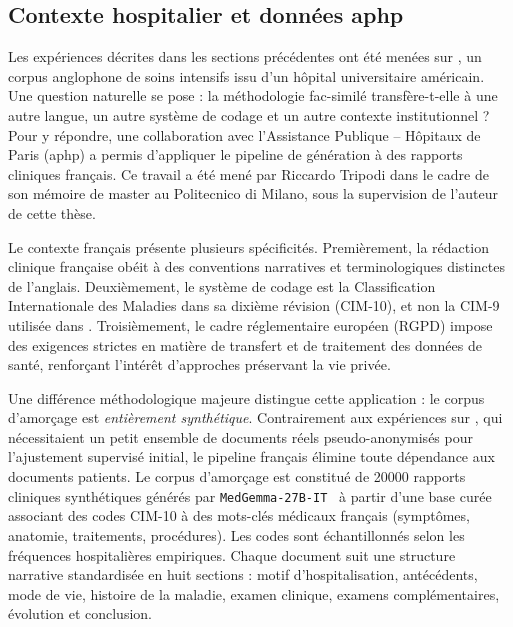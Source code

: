

\subsection{Contexte hospitalier et données \gls{aphp}}

Les expériences décrites dans les sections précédentes ont été menées sur \mimic{}, un corpus anglophone de soins intensifs issu d'un hôpital universitaire américain.
Une question naturelle se pose : la méthodologie fac-similé transfère-t-elle à une autre langue, un autre système de codage et un autre contexte institutionnel ?
Pour y répondre, une collaboration avec l'Assistance Publique -- Hôpitaux de Paris (\gls{aphp}) a permis d'appliquer le pipeline de génération à des rapports cliniques français.
Ce travail a été mené par Riccardo Tripodi dans le cadre de son mémoire de master au Politecnico di Milano, sous la supervision de l'auteur de cette thèse.

Le contexte français présente plusieurs spécificités.
Premièrement, la rédaction clinique française obéit à des conventions narratives et terminologiques distinctes de l'anglais.
Deuxièmement, le système de codage est la Classification Internationale des Maladies dans sa dixième révision (CIM-10), et non la CIM-9 utilisée dans \mimic{}.
Troisièmement, le cadre réglementaire européen (RGPD) impose des exigences strictes en matière de transfert et de traitement des données de santé, renforçant l'intérêt d'approches préservant la vie privée.

Une différence méthodologique majeure distingue cette application : le corpus d'amorçage est \emph{entièrement synthétique}.
Contrairement aux expériences sur \mimic{}, qui nécessitaient un petit ensemble de documents réels pseudo-anonymisés pour l'ajustement supervisé initial, le pipeline français élimine toute dépendance aux documents patients.
Le corpus d'amorçage est constitué de \num{20000} rapports cliniques synthétiques générés par \verb|MedGemma-27B-IT|~\citep{sellergren2025medgemma} à partir d'une base curée associant des codes CIM-10 à des mots-clés médicaux français (symptômes, anatomie, traitements, procédures).
Les codes sont échantillonnés selon les fréquences hospitalières empiriques.
Chaque document suit une structure narrative standardisée en huit sections : motif d'hospitalisation, antécédents, mode de vie, histoire de la maladie, examen clinique, examens complémentaires, évolution et conclusion.

